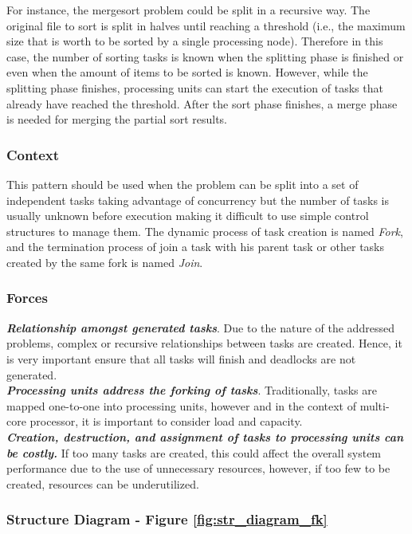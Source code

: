For instance, the mergesort problem could be split in a recursive way. The original file to sort is split in halves until reaching a threshold (i.e., the maximum size that is worth to be sorted by a single processing node). Therefore in this case, the number of sorting tasks is known when the splitting phase is finished or even when the amount of items to be sorted is known. However, while the splitting phase finishes, processing units can start the execution of tasks that already have reached the threshold. After the sort phase finishes, a merge phase is needed for merging the partial sort results.

\subsubsection{Context}

This pattern should be used when the problem can be split into a set of independent tasks taking advantage of concurrency but the number of tasks is usually unknown before execution making it difficult to use simple control structures to manage them. The dynamic process of task creation is named \textit{Fork}, and the termination process of join a task with his parent task or other tasks created by the same fork is named \textit{Join}.

\subsubsection{Forces}

\noindent\textbf{\textit{Relationship amongst generated tasks}}. Due to the nature of the addressed problems, complex or recursive relationships between tasks are created. Hence, it is very important ensure that all tasks will finish and deadlocks are not generated.\\

\noindent\textbf{\textit{Processing units address the forking of tasks}}. Traditionally, tasks are mapped one-to-one into processing units, however and in the context of multi-core processor, it is important to consider load and capacity.\\

\noindent\textbf{\textit{Creation, destruction, and assignment of tasks to processing units can be costly.}} If too many tasks are created, this could affect the overall system performance due to the use of unnecessary resources, however, if too few to be created, resources can be underutilized.

\subsubsection{Structure Diagram - Figure \ref{fig:str_diagram_fk}}

